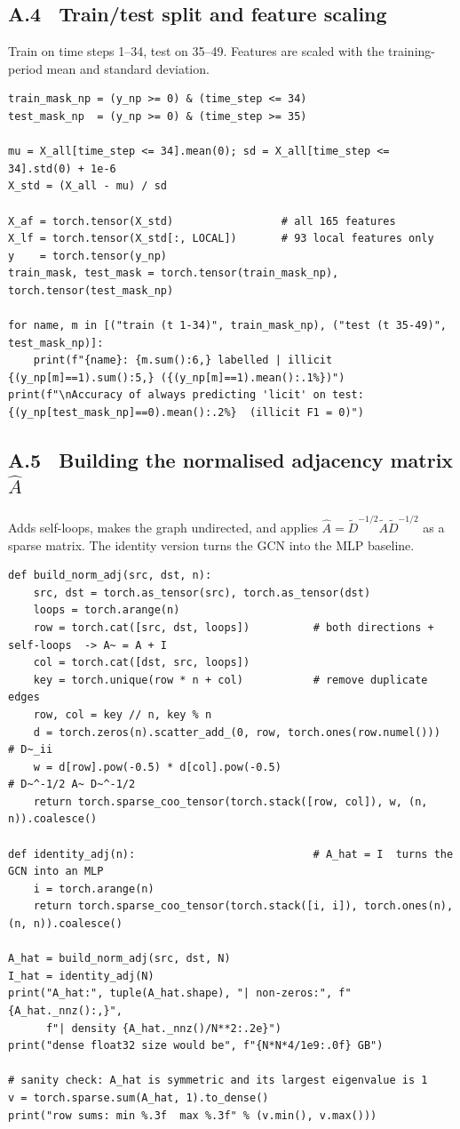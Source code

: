 \subsection*{A.4 \ Train/test split and feature scaling}
Train on time steps 1--34, test on 35--49. Features are scaled with the training-period mean and standard deviation.
\begin{lstlisting}
train_mask_np = (y_np >= 0) & (time_step <= 34)
test_mask_np  = (y_np >= 0) & (time_step >= 35)

mu = X_all[time_step <= 34].mean(0); sd = X_all[time_step <= 34].std(0) + 1e-6
X_std = (X_all - mu) / sd

X_af = torch.tensor(X_std)                 # all 165 features
X_lf = torch.tensor(X_std[:, LOCAL])       # 93 local features only
y    = torch.tensor(y_np)
train_mask, test_mask = torch.tensor(train_mask_np), torch.tensor(test_mask_np)

for name, m in [("train (t 1-34)", train_mask_np), ("test (t 35-49)", test_mask_np)]:
    print(f"{name}: {m.sum():6,} labelled | illicit {(y_np[m]==1).sum():5,} ({(y_np[m]==1).mean():.1%})")
print(f"\nAccuracy of always predicting 'licit' on test: {(y_np[test_mask_np]==0).mean():.2%}  (illicit F1 = 0)")
\end{lstlisting}

\subsection*{A.5 \ Building the normalised adjacency matrix $\hat A$}
Adds self-loops, makes the graph undirected, and applies $\hat A = \tilde D^{-1/2}\tilde A\tilde D^{-1/2}$ as a sparse matrix. The identity version turns the GCN into the MLP baseline.
\begin{lstlisting}
def build_norm_adj(src, dst, n):
    src, dst = torch.as_tensor(src), torch.as_tensor(dst)
    loops = torch.arange(n)
    row = torch.cat([src, dst, loops])          # both directions + self-loops  -> A~ = A + I
    col = torch.cat([dst, src, loops])
    key = torch.unique(row * n + col)           # remove duplicate edges
    row, col = key // n, key % n
    d = torch.zeros(n).scatter_add_(0, row, torch.ones(row.numel()))   # D~_ii
    w = d[row].pow(-0.5) * d[col].pow(-0.5)                             # D~^-1/2 A~ D~^-1/2
    return torch.sparse_coo_tensor(torch.stack([row, col]), w, (n, n)).coalesce()

def identity_adj(n):                            # A_hat = I  turns the GCN into an MLP
    i = torch.arange(n)
    return torch.sparse_coo_tensor(torch.stack([i, i]), torch.ones(n), (n, n)).coalesce()

A_hat = build_norm_adj(src, dst, N)
I_hat = identity_adj(N)
print("A_hat:", tuple(A_hat.shape), "| non-zeros:", f"{A_hat._nnz():,}",
      f"| density {A_hat._nnz()/N**2:.2e}")
print("dense float32 size would be", f"{N*N*4/1e9:.0f} GB")

# sanity check: A_hat is symmetric and its largest eigenvalue is 1
v = torch.sparse.sum(A_hat, 1).to_dense()
print("row sums: min %.3f  max %.3f" % (v.min(), v.max()))
\end{lstlisting}

